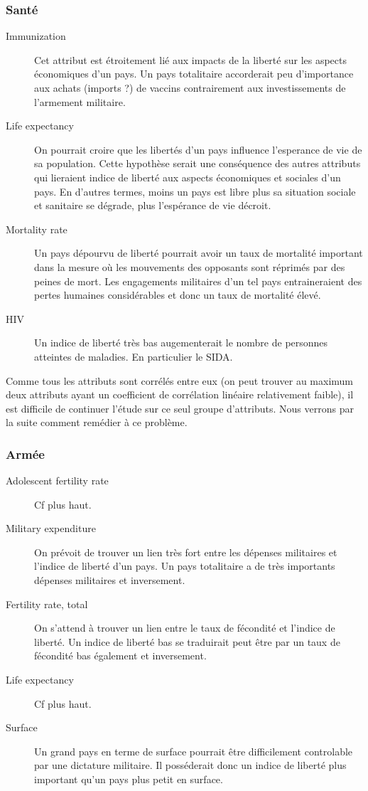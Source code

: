 \subsubsection{Santé}
\begin{description}
\item [Immunization]
Cet attribut est étroitement lié aux impacts de la liberté sur les aspects économiques d'un pays. Un pays totalitaire
accorderait peu d'importance aux achats (imports ?) de vaccins contrairement aux investissements de l'armement militaire.
\item [Life expectancy]
On pourrait croire que les libertés d'un pays influence l'esperance de vie de sa population. Cette hypothèse serait une conséquence
des autres attributs qui lieraient indice de liberté aux aspects économiques et sociales d'un pays. En d'autres termes, moins un pays est libre plus sa situation sociale et sanitaire se dégrade, plus l'espérance de vie décroit.
\item [Mortality rate]
Un pays dépourvu de liberté pourrait avoir un taux de mortalité important dans la mesure où les mouvements des opposants sont réprimés par des peines de mort.
Les engagements militaires d'un tel pays entraineraient des pertes humaines considérables et donc un taux de mortalité élevé.
\item [HIV]
Un indice de liberté très bas augementerait le nombre de personnes atteintes de maladies. En particulier le SIDA.
\end{description}

Comme tous les attributs sont corrélés entre eux (on peut trouver au maximum deux attributs ayant un coefficient de corrélation linéaire relativement faible), il est difficile de continuer l'étude sur ce seul groupe d'attributs. Nous verrons par la suite comment remédier à ce problème.

\subsubsection{Armée}
\begin{description}
\item [Adolescent fertility rate]
Cf plus haut.
\item [Military expenditure]
On prévoit de trouver un lien très fort entre les dépenses militaires et l'indice de liberté d'un pays. Un pays totalitaire a de très importants dépenses militaires et inversement.
\item [Fertility rate, total]
On s'attend à trouver un lien entre le taux de fécondité et l'indice de liberté. Un indice de liberté bas se traduirait peut être par un taux de fécondité bas également et inversement.
\item [Life expectancy]
Cf plus haut.
\item [Surface]
Un grand pays en terme de surface pourrait être difficilement controlable par une dictature militaire. Il posséderait donc un indice de liberté plus important qu'un pays plus petit en surface.
\end{description}

